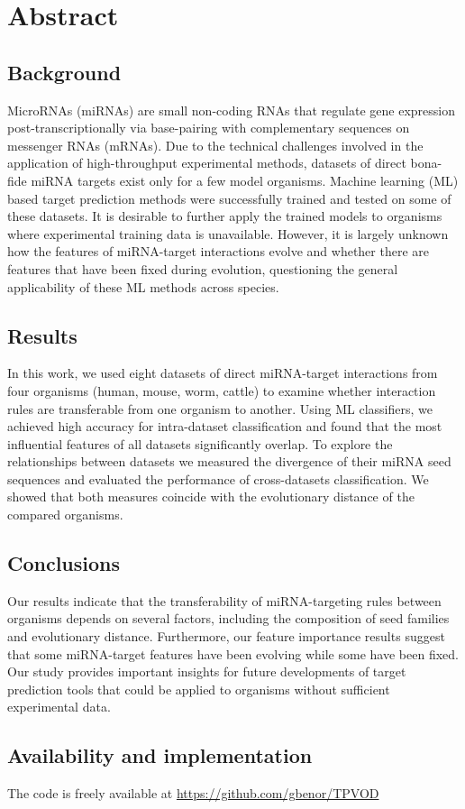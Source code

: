 \chapter*{Abstract}
\section*{Background} %
MicroRNAs (miRNAs) are small non-coding RNAs that regulate gene expression post-transcriptionally via base-pairing with complementary sequences on messenger RNAs (mRNAs). Due to the technical challenges involved in the application of high-throughput experimental methods, datasets of direct bona-fide miRNA targets exist only for a few model organisms. Machine learning (ML) based target prediction methods were successfully trained and tested on some of these datasets. It is desirable to further apply the trained models to organisms where experimental training data is unavailable. However, it is largely unknown how the features of miRNA-target interactions evolve and whether there are features that have been fixed during evolution, questioning the general applicability of these ML methods across species.

\section*{Results} %
In this work, we used eight datasets of direct miRNA-target interactions from four organisms (human, mouse, worm, cattle) to examine whether interaction rules are transferable from one organism to another. Using ML classifiers, we achieved high accuracy for intra-dataset classification and found that the most influential features of all datasets significantly overlap. To explore the relationships between datasets we measured the divergence of their miRNA seed sequences and evaluated the performance of cross-datasets classification. We showed that both measures coincide with the evolutionary distance of the compared organisms.

\section*{Conclusions} %
Our results indicate that the transferability of miRNA-targeting rules between organisms depends on several factors, including the composition of seed families and evolutionary distance. Furthermore, our feature importance results suggest that some miRNA-target features have been evolving while some have been fixed. Our study provides important insights for future developments of target prediction tools that could be applied to organisms without sufficient experimental data.

\section*{Availability and implementation} The code is freely available at \url{https://github.com/gbenor/TPVOD}

